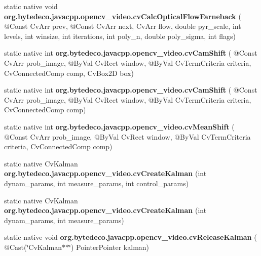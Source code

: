 \begin{DoxyCompactItemize}
\item 
\mbox{\label{group__video__c_gace5e3800ce5e02bf5a0e778a622eefc8}} 
static native void {\bfseries org.\+bytedeco.\+javacpp.\+opencv\+\_\+video.\+cv\+Calc\+Optical\+Flow\+Farneback} ( @Const Cv\+Arr prev, @Const Cv\+Arr next, Cv\+Arr flow, double pyr\+\_\+scale, int levels, int winsize, int iterations, int poly\+\_\+n, double poly\+\_\+sigma, int flags)
\item 
\mbox{\label{group__video__c_gade32ff7afa7d5f8f1a7d92589060600e}} 
static native int {\bfseries org.\+bytedeco.\+javacpp.\+opencv\+\_\+video.\+cv\+Cam\+Shift} ( @Const Cv\+Arr prob\+\_\+image, @By\+Val Cv\+Rect window, @By\+Val Cv\+Term\+Criteria criteria, Cv\+Connected\+Comp comp, Cv\+Box2D box)
\item 
\mbox{\label{group__video__c_ga9b20b7c9f8a606bb902d3ccabf697097}} 
static native int {\bfseries org.\+bytedeco.\+javacpp.\+opencv\+\_\+video.\+cv\+Cam\+Shift} ( @Const Cv\+Arr prob\+\_\+image, @By\+Val Cv\+Rect window, @By\+Val Cv\+Term\+Criteria criteria, Cv\+Connected\+Comp comp)
\item 
\mbox{\label{group__video__c_ga6e996ddf87c7bda8119ce2bbbdfa3bb3}} 
static native int {\bfseries org.\+bytedeco.\+javacpp.\+opencv\+\_\+video.\+cv\+Mean\+Shift} ( @Const Cv\+Arr prob\+\_\+image, @By\+Val Cv\+Rect window, @By\+Val Cv\+Term\+Criteria criteria, Cv\+Connected\+Comp comp)
\item 
\mbox{\label{group__video__c_ga46666ad7a99014eb2e428db5278e39a4}} 
static native Cv\+Kalman {\bfseries org.\+bytedeco.\+javacpp.\+opencv\+\_\+video.\+cv\+Create\+Kalman} (int dynam\+\_\+params, int measure\+\_\+params, int control\+\_\+params)
\item 
\mbox{\label{group__video__c_gafe8a8f444c9adf11b9ec23c17d9712e0}} 
static native Cv\+Kalman {\bfseries org.\+bytedeco.\+javacpp.\+opencv\+\_\+video.\+cv\+Create\+Kalman} (int dynam\+\_\+params, int measure\+\_\+params)
\item 
\mbox{\label{group__video__c_gafc150c92c667d05d0fdeedbb9282acde}} 
static native void {\bfseries org.\+bytedeco.\+javacpp.\+opencv\+\_\+video.\+cv\+Release\+Kalman} ( @Cast(\char`\"{}Cv\+Kalman$\ast$$\ast$\char`\"{}) Pointer\+Pointer kalman)
$$
\end{DoxyCompactItemize}
